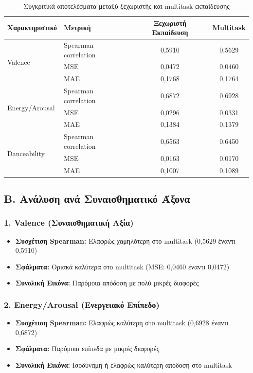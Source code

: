 \documentclass[a4paper,12pt]{article}
\begin{document}
\begin{table}[H]
    \centering
    \begin{tabular}{llcc}
    \toprule
    \textbf{Χαρακτηριστικό} & \textbf{Μετρική} & \textbf{Ξεχωριστή Εκπαίδευση} & \textbf{Multitask} \\
    \midrule
    \multirow{3}{*}{Valence} 
    & Spearman correlation & 0,5910 & 0,5629 \\
    & MSE & 0,0472 & 0,0460 \\
    & MAE & 0,1768 & 0,1764 \\
    \midrule
    \multirow{3}{*}{Energy/Arousal}
    & Spearman correlation & 0,6872 & 0,6928 \\
    & MSE & 0,0296 & 0,0331 \\
    & MAE & 0,1384 & 0,1379 \\
    \midrule
    \multirow{3}{*}{Danceability}
    & Spearman correlation & 0,6563 & 0,6450 \\
    & MSE & 0,0163 & 0,0170 \\
    & MAE & 0,1007 & 0,1089 \\
    \bottomrule
    \end{tabular}
    \caption{Συγκριτικά αποτελέσματα μεταξύ ξεχωριστής και multitask εκπαίδευσης}
\end{table}

\subsection*{Β. Ανάλυση ανά Συναισθηματικό Άξονα}

\subsubsection*{1. Valence (Συναισθηματική Αξία)}
\begin{itemize}
    \item \textbf{Συσχέτιση Spearman:} Ελαφρώς χαμηλότερη στο multitask (0,5629 έναντι 0,5910)
    \item \textbf{Σφάλματα:} Οριακά καλύτερα στο multitask (MSE: 0,0460 έναντι 0,0472)
    \item \textbf{Συνολική Εικόνα:} Παρόμοια απόδοση με πολύ μικρές διαφορές
\end{itemize}

\subsubsection*{2. Energy/Arousal (Ενεργειακό Επίπεδο)}
\begin{itemize}
    \item \textbf{Συσχέτιση Spearman:} Ελαφρώς καλύτερη στο multitask (0,6928 έναντι 0,6872)
    \item \textbf{Σφάλματα:} Παρόμοια επίπεδα με μικρές διαφορές
    \item \textbf{Συνολική Εικόνα:} Ισοδύναμη ή ελαφρώς καλύτερη απόδοση στο multitask
\end{itemize}
\end{document}
